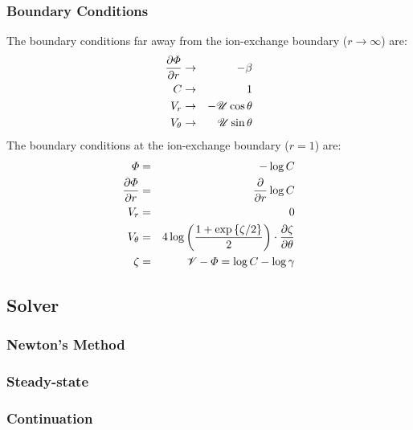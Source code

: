 \subsubsection{Boundary Conditions}
The boundary conditions far away from the ion-exchange boundary ($r\rightarrow\infty$) are:
\begin{eqnarray}
\frac{\partial \varPhi}{\partial r} &\rightarrow& -\beta \\
C &\rightarrow& 1 \\
V_r &\rightarrow& -\mathscr{U} \cos\theta \\
V_\theta &\rightarrow& \mathscr{U} \sin\theta
\end{eqnarray}
The boundary conditions at the ion-exchange boundary ($r=1$) are:
\begin{eqnarray}
\varPhi &=& -\log C \\
\frac{\partial \varPhi}{\partial r} &=& \frac{\partial }{\partial r} \log C \\
V_r &=& 0 \\
V_\theta &=& 4\log\left(\frac{1 + \exp\left\{\zeta/2\right\}}{2}\right) \cdot \frac{\partial \zeta}{\partial \theta} \\
 \nonumber \zeta &=& \mathscr{V} - \varPhi = \log C - \log \gamma
\end{eqnarray}

\subsection{Solver}
\subsubsection{Newton's Method}
\subsubsection{Steady-state}
\subsubsection{Continuation}
